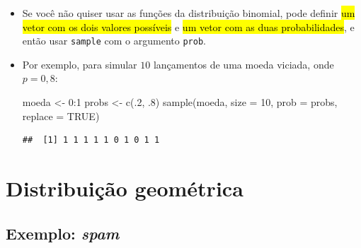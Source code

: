 \documentclass[
  11pt]{report}
\newenvironment{Shaded}{\begin{snugshade}}{\end{snugshade}}
\newcommand{\AttributeTok}[1]{\textcolor[rgb]{0.77,0.63,0.00}{#1}}
\newcommand{\ConstantTok}[1]{\textcolor[rgb]{0.00,0.00,0.00}{#1}}
\newcommand{\DecValTok}[1]{\textcolor[rgb]{0.00,0.00,0.81}{#1}}
\newcommand{\FunctionTok}[1]{\textcolor[rgb]{0.00,0.00,0.00}{#1}}
\newcommand{\NormalTok}[1]{#1}
\newcommand{\OtherTok}[1]{\textcolor[rgb]{0.56,0.35,0.01}{#1}}
\newcommand{\SpecialCharTok}[1]{\textcolor[rgb]{0.00,0.00,0.00}{#1}}
\renewenvironment{Shaded}{
    \begin{mdframed}[%
      roundcorner=2pt,%
      innerleftmargin=5pt,%
      innerrightmargin=5pt,%
      topline=true,%
      leftline=true,%
      rightline=true,%
      bottomline=true,%
      linewidth=0.5pt,%
      linecolor=black!20,%
      backgroundcolor=black!2,%
      skipabove=2ex,%
      skipbelow=2.5ex%
    ]%
  }
  {
    \end{mdframed}
  }
\begin{document}
\begin{itemize}
\item
  Se você não quiser usar as funções da distribuição binomial, pode definir {\hl{um vetor com os dois valores possíveis}} e {\hl{um vetor com as duas probabilidades}}, e então usar \texttt{sample} com o argumento \texttt{prob}.
\item
  Por exemplo, para simular $10$ lançamentos de uma moeda viciada, onde $p = 0{,}8$:

\begin{Shaded}
\begin{Highlighting}[]
\NormalTok{moeda }\OtherTok{\textless{}{-}} \DecValTok{0}\SpecialCharTok{:}\DecValTok{1}
\NormalTok{probs }\OtherTok{\textless{}{-}} \FunctionTok{c}\NormalTok{(.}\DecValTok{2}\NormalTok{, .}\DecValTok{8}\NormalTok{)}
\FunctionTok{sample}\NormalTok{(moeda, }\AttributeTok{size =} \DecValTok{10}\NormalTok{, }\AttributeTok{prob =}\NormalTok{ probs, }\AttributeTok{replace =} \ConstantTok{TRUE}\NormalTok{)}
\end{Highlighting}
\end{Shaded}

\begin{verbatim}
##  [1] 1 1 1 1 1 0 1 0 1 1
\end{verbatim}
\end{itemize}

\hypertarget{distribuiuxe7uxe3o-geomuxe9trica}{%
\section{Distribuição geométrica}\label{distribuiuxe7uxe3o-geomuxe9trica}}

\hypertarget{exemplo-spam}{%
\subsection{\texorpdfstring{Exemplo: \emph{spam}}{Exemplo: spam}}\label{exemplo-spam}}
\end{document}
